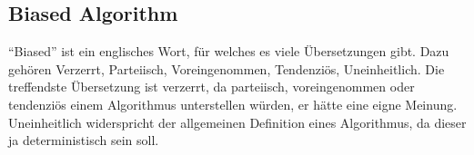 \subsection{Biased Algorithm}
\enquote{Biased} ist ein englisches Wort, für welches es viele Übersetzungen gibt. Dazu gehören Verzerrt, Parteiisch, Voreingenommen, Tendenziös, Uneinheitlich. Die treffendste Übersetzung ist verzerrt, da parteiisch, voreingenommen oder tendenziös einem Algorithmus unterstellen würden, er hätte eine eigne Meinung. Uneinheitlich widerspricht der allgemeinen Definition eines Algorithmus, da dieser ja deterministisch sein soll.  
